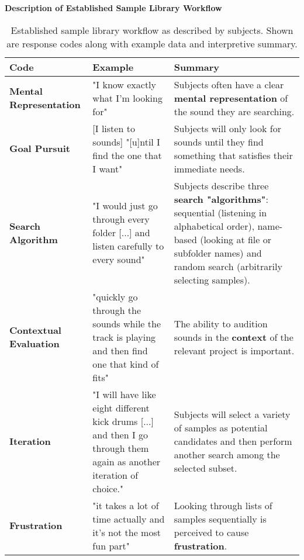 \clearpage

\begin{table}[!htb]
  \textbf{Description of Established Sample Library Workflow}
  \renewcommand{\arraystretch}{1.2}
  \centering
  \footnotesize
  \begin{tabular}{ p{4.0cm} p{4.75cm} p{4.75cm} }
  \hline
    \textbf{Code} & \textbf{Example} & \textbf{Summary} \\
    \hline
    \textbf{Mental Representation}
    &
    "I know exactly what I'm looking for"
    &
    Subjects often have a clear \textbf{mental representation} of the sound they
    are searching.
    \\
    \textbf{Goal Pursuit}
    &
    [I listen to sounds] "[u]ntil I find the one that I want"
    &
    Subjects will only look for sounds until they find something that satisfies
    their immediate needs.
    \\
    \textbf{Search Algorithm}
    &
    "I would just go through every folder [...] and listen carefully to every
    sound"
    &
    Subjects describe three \textbf{search "algorithms"}: sequential
    (listening in alphabetical order), name-based (looking at file or subfolder
    names) and random search (arbitrarily selecting samples).
    \\
    \textbf{Contextual Evaluation}
    &
    "quickly go through the sounds while the track is playing and then find
    one that kind of fits"
    &
    The ability to audition sounds in the \textbf{context} of the relevant
    project is important.
    \\
    \textbf{Iteration}
    &
    "I will have like eight different kick drums [...] and then I go through
    them again as another iteration of choice."
    &
    Subjects will select a variety of samples as potential candidates and then
    perform another search among the selected subset.
    \\
    \textbf{Frustration}
    &
    "it takes a lot of time actually and it's not the most fun part"
    &
    Looking through lists of samples sequentially is perceived to cause
    \textbf{frustration}.
    \\
  \end{tabular}
  \caption[Established Sample Library Workflow Description: Response Codes]
  {Established sample library workflow as described by subjects. Shown are
  response codes along with example data and interpretive summary.}
  \label{table:current_workflow_description}
\end{table}

